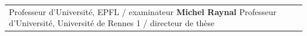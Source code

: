 \begin{titlepage}
\begin{center}
\begin{minipage}{\glarg}
\begin{tabular}{p{7cm}p{10cm}}
\begin{minipage}{\plarg}
{ Professeur d'Universit{\'e}, EPFL \!/\! examinateur \vspace{1.0mm}\newline}
{\Large\bf Michel Raynal \vspace{0mm}\newline}
{ Professeur d'Universit{\'e}, Universit{\'e} de Rennes 1 \!/\! directeur de th\`ese\vspace{-10mm}\newline}



\end{minipage}
\end{tabular}

\end{minipage}
\end{center}
\end{titlepage}

